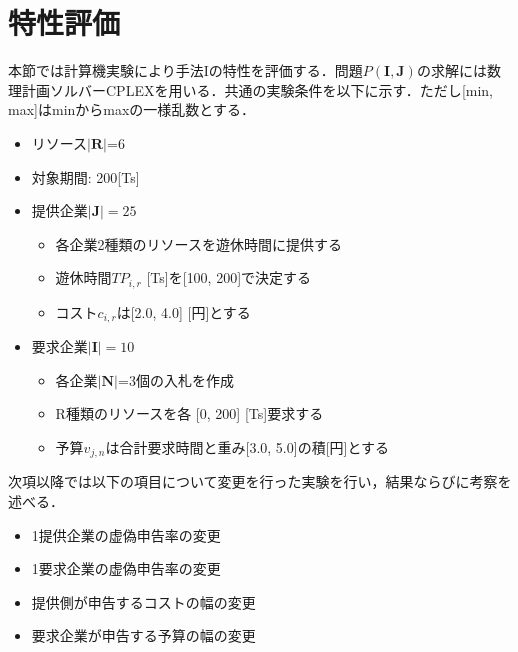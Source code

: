 \hypertarget{ux7279ux6027ux8a55ux4fa1}{%
\section{\texorpdfstring{特性評価\label{exp-condition}}{特性評価}}\label{ux7279ux6027ux8a55ux4fa1}}

本節では計算機実験により手法Iの特性を評価する．問題\(P(\boldsymbol{I},\boldsymbol{J})\)の求解には数理計画ソルバーCPLEXを用いる．共通の実験条件を以下に示す．ただし{[}min,
max{]}はminからmaxの一様乱数とする．

\begin{itemize}
\tightlist
\item
  リソース\(|\boldsymbol{R}|\)=6
\item
  対象期間: 200{[}Ts{]}
\item
  提供企業\(|\boldsymbol{J}|=25\)

  \begin{itemize}
  \tightlist
  \item
    各企業2種類のリソースを遊休時間に提供する
  \item
    遊休時間\(TP_{i,r}\) {[}Ts{]}を{[}100, 200{]}で決定する
  \item
    コスト\(c_{i,r}\)は{[}2.0, 4.0{]} {[}円{]}とする
  \end{itemize}
\item
  要求企業\(|\boldsymbol{I}|=10\)

  \begin{itemize}
  \tightlist
  \item
    各企業\(|\boldsymbol{N}|\)=3個の入札を作成
  \item
    R種類のリソースを各 {[}0, 200{]} {[}Ts{]}要求する
  \item
    予算\(v_{j,n}\)は合計要求時間と重み{[}3.0, 5.0{]}の積{[}円{]}とする
  \end{itemize}
\end{itemize}

次項以降では以下の項目について変更を行った実験を行い，結果ならびに考察を述べる．

\begin{itemize}
\tightlist
\item
  1提供企業の虚偽申告率の変更
\item
  1要求企業の虚偽申告率の変更
\item
  提供側が申告するコストの幅の変更
\item
  要求企業が申告する予算の幅の変更
\end{itemize}


